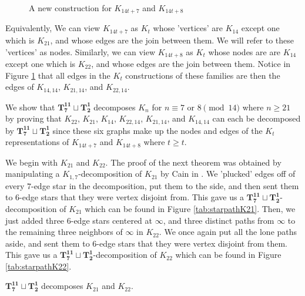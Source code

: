 \begin{figure}[H]
\begin{center}
    \end{center}
    \caption{A new construction for $K_{14t+7}$ and $K_{14t+8}$}
    \label{fig:newconstrK21K22}
  \end{figure}
Equivalently, We can view $K_{14t+7}$ as $K_{t}$ whose 'vertices' are $K_{14}$ except one which is $K_{21}$, and whose edges are the join between them. We will refer to these 'vertices' as nodes. Similarly, we can view $K_{14t+8}$ as $K_{t}$ whose nodes are are $K_{14}$ except one which is $K_{22}$, and whose edges are the join between them. Notice in Figure \ref{fig:newconstrK21K22} that all edges in the $K_{t}$ constructions of these families are then the edges of $K_{14,14}$, $K_{21,14}$, and $K_{22,14}$.

We show that $\mathbf{T_{7}^{11}}\sqcup\mathbf{T_{2}^{1}}$ decomposes $K_{n}$ for $n\equiv7 \textrm{ or }8\pmod{14}$ where $n\geq 21$ by proving that $K_{22}$, $K_{21}$, $K_{14}$, $K_{22,14}$, $K_{21,14}$, and $K_{14,14}$ can each be decomposed by $\mathbf{T_{7}^{11}}\sqcup\mathbf{T_{2}^{1}}$ since these six graphs make up the nodes and edges of the $K_{t}$ representations of $K_{14t+7}$ and $K_{14t+8}$ where $t\geq t$.\newline

We begin with $K_{21}$ and $K_{22}$. The proof of the next theorem was obtained by manipulating a $K_{1,7}$-decomposition of $K_{21}$ by Cain in \cite{Cain}. We 'plucked' edges off of every $7$-edge star in the decomposition, put them to the side, and then sent them to $6$-edge stars that they were vertex disjoint from. This gave us a $\mathbf{T_{7}^{11}}\sqcup\mathbf{T_{2}^{1}}$-decomposition of $K_{21}$ which can be found in Figure \ref{tab:starpathK21}. Then, we just added three $6$-edge stars centered at $\infty$, and three distinct paths from $\infty$ to the remaining three neighbors of $\infty$ in $K_{22}$. We once again put all the lone paths aside, and sent them to $6$-edge stars that they were vertex disjoint from them. This gave us a $\mathbf{T_{7}^{11}}\sqcup\mathbf{T_{2}^{1}}$-decomposition of $K_{22}$ which can be found in Figure \ref{tab:starpathK22}.
\begin{thm}\label{thm:PCstarpath}
    $\mathbf{T_{7}^{11}}\sqcup\mathbf{T_{2}^{1}}$ decomposes $K_{21}$ and $K_{22}$.
\end{thm}

